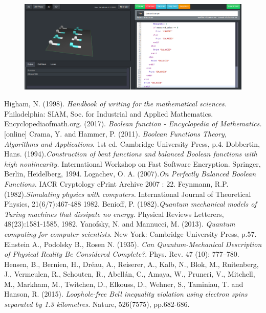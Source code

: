 \documentclass[12pt,a4paper,openright]{report}
\begin{document}
\begin{figure}[h]
    
            \includegraphics[width=.92\textwidth,height=\textheight,keepaspectratio]{nonLinearBalancedFunction}
        
\end{figure}


\begin{thebibliography}{30}
     Higham, N. (1998). \emph{Handbook of writing for the mathematical sciences.} Philadelphia: SIAM, Soc. for Industrial and Applied Mathematics.
     Encyclopediaofmath.org. (2017). \emph{Boolean function - Encyclopedia of Mathematics.} [online] 
     Crama, Y. and Hammer, P. (2011). \emph{Boolean Functions Theory, Algorithms and Applications}. 1st ed. Cambridge University Press, p.4.
     Dobbertin, Hans. (1994).\emph{Construction of bent functions and balanced Boolean functions with high nonlinearity.} International Workshop on Fast Software Encryption. Springer, Berlin, Heidelberg, 1994.
     Logachev, O. A. (2007).\emph{On Perfectly Balanced Boolean Functions.} IACR Cryptology ePrint Archive 2007 : 22.
     Feynmann, R.P. (1982).\emph{Simulating physics with computers.} International Journal of Theoretical Physics, 21(6/7):467-488 1982.
     Benioff, P. (1982).\emph{Quantum mechanical models of Turing machines that dissipate no energy.} Physical Reviews Letterers, 48(23):1581-1585, 1982.
     Yanofsky, N. and Mannucci, M. (2013). \emph{Quantum computing for computer scientists}. New York: Cambridge University Press, p.57.
     Einstein A., Podolsky B., Rosen N. (1935). \emph{Can Quantum-Mechanical Description of Physical Reality Be Considered Complete?}. Phys. Rev. 47 (10): 777–780. 
     Hensen, B., Bernien, H., Dréau, A., Reiserer, A., Kalb, N., Blok, M., Ruitenberg, J., Vermeulen, R., Schouten, R., Abellán, C., Amaya, W., Pruneri, V., Mitchell, M., Markham, M., Twitchen, D., Elkouss, D., Wehner, S., Taminiau, T. and Hanson, R. (2015). \emph{Loophole-free Bell inequality violation using electron spins separated by 1.3 kilometres.} Nature, 526(7575), pp.682-686.

\end{thebibliography}
\end{document}
